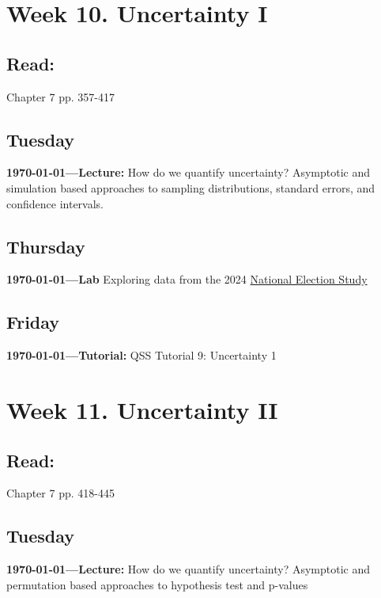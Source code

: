 \section{Week 10. Uncertainty I}

\subsection{Read:} 
\citet{Imai2022-pm} Chapter 7 pp. 357-417

\subsection{Tuesday} \textbf{\today---Lecture:} How do we quantify uncertainty? Asymptotic and simulation based approaches to sampling distributions, standard errors, and confidence intervals. 

\AdvanceDate[2]

\subsection{Thursday} \textbf{\today---Lab} Exploring data from the 2024 \href{http://electionstudies.org/}{National Election Study}

\AdvanceDate[1]
\subsection{Friday} \textbf{\today---Tutorial:} QSS Tutorial 9: Uncertainty 1
\AdvanceDate[4]



\vspace{2em}


\section{Week 11. Uncertainty II}

\subsection{Read:}

\citet{Imai2022-pm} Chapter 7 pp. 418-445

\subsection{Tuesday} \textbf{\today---Lecture:} How do we quantify uncertainty? Asymptotic and permutation based approaches to hypothesis test and p-values 
\AdvanceDate[2]

